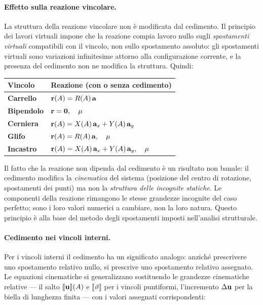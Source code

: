 \paragraph{Effetto sulla reazione vincolare.}
La struttura della reazione vincolare non è modificata dal
cedimento. Il principio dei lavori virtuali impone che la
reazione compia lavoro nullo sugli \emph{spostamenti
	virtuali} compatibili con il vincolo, non sullo spostamento
assoluto: gli spostamenti virtuali sono variazioni
infinitesime attorno alla configurazione corrente, e la
presenza del cedimento non ne modifica la struttura. Quindi:

\begin{center}
	\renewcommand{\arraystretch}{1.6}
	\small
	\begin{tabular}{>{\bfseries}ll}
		\toprule
		Vincolo & Reazione (con o senza cedimento)\\
		\midrule
		Carrello  & $\mathbf{r}(A) = R(A)\,\mathbf{a}$\\
		Bipendolo & $\mathbf{r} = \mathbf{0},\quad \mu$\\
		Cerniera  & $\mathbf{r}(A) = X(A)\,\mathbf{a}_x + Y(A)\,\mathbf{a}_y$\\
		Glifo     & $\mathbf{r}(A) = R(A)\,\mathbf{a},\quad \mu$\\
		Incastro  & $\mathbf{r}(A) = X(A)\,\mathbf{a}_x + Y(A)\,\mathbf{a}_y,
		\quad \mu$\\
		\bottomrule
	\end{tabular}
\end{center}

\begin{oss}
	Il fatto che la reazione non dipenda dal cedimento è
	un risultato non banale: il cedimento modifica la
	\emph{cinematica} del sistema (posizione del centro
	di rotazione, spostamenti dei punti) ma non la
	\emph{struttura delle incognite statiche}. Le
	componenti della reazione rimangono le stesse
	grandezze incognite del caso perfetto; sono i loro
	valori numerici a cambiare, non la loro natura.
	Questo principio è alla base del metodo degli
	spostamenti imposti nell'analisi strutturale.
\end{oss}

\paragraph{Cedimento nei vincoli interni.}
Per i vincoli interni il cedimento ha un significato
analogo: anziché prescrivere uno spostamento relativo
nullo, si prescrive uno spostamento relativo assegnato.
Le equazioni cinematiche si generalizzano sostituendo
le grandezze cinematiche relative --- il salto
$\llbracket\mathbf{u}\rrbracket(A)$ e $\llbracket\vartheta\rrbracket$
per i vincoli puntiformi, l'incremento $\Delta\mathbf{u}$ per la
biella di lunghezza finita --- con i valori assegnati
corrispondenti:

